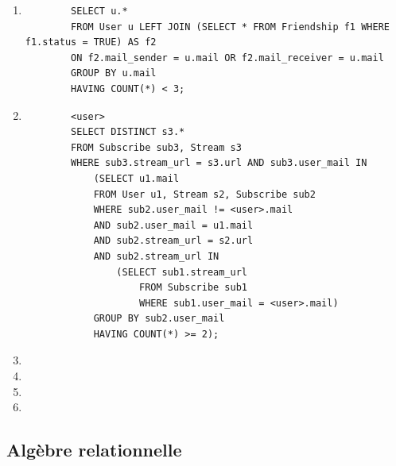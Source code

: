 \documentclass[a4paper,10pt]{article}
\begin{document}
	\begin{enumerate}
	    \item 
	    \begin{verbatim}
		SELECT u.*
		FROM User u LEFT JOIN (SELECT * FROM Friendship f1 WHERE f1.status = TRUE) AS f2 
		ON f2.mail_sender = u.mail OR f2.mail_receiver = u.mail
		GROUP BY u.mail
		HAVING COUNT(*) < 3;
             \end{verbatim}
	    \item
             \begin{verbatim}
		<user>
		SELECT DISTINCT s3.*
		FROM Subscribe sub3, Stream s3
		WHERE sub3.stream_url = s3.url AND sub3.user_mail IN
		    (SELECT u1.mail
		    FROM User u1, Stream s2, Subscribe sub2
		    WHERE sub2.user_mail != <user>.mail
		    AND sub2.user_mail = u1.mail 
		    AND sub2.stream_url = s2.url 
		    AND sub2.stream_url IN    
		        (SELECT sub1.stream_url 
		            FROM Subscribe sub1 
		            WHERE sub1.user_mail = <user>.mail)
		    GROUP BY sub2.user_mail
		    HAVING COUNT(*) >= 2);
             \end{verbatim}
	    \item 
	    \item 
	    \item 
	    \item 
	\end{enumerate}

\subsection{Algèbre relationnelle}

\end{document}
